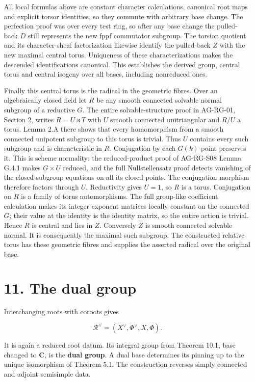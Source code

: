 \documentclass[11pt,a4paper,openany]{report}
\begin{document}
All local formulas above are constant character calculations, canonical root maps and explicit torsor identities, so they commute with arbitrary base change. The perfection proof was over every test ring, so after any base change the pulled-back \(D\) still represents the new fppf commutator subgroup. The torsion quotient and its character-sheaf factorization likewise identify the pulled-back \(Z\) with the new maximal central torus. Uniqueness of these characterizations makes the descended identifications canonical. This establishes the derived group, central torus and central isogeny over all bases, including nonreduced ones.

Finally this central torus is the radical in the geometric fibres. Over an algebraically closed field let \(R\) be any smooth connected solvable normal subgroup of a reductive \(G\). The entire solvable-structure proof in AG-RG-01, Section 2, writes \(R=U\rtimes T\) with \(U\) smooth connected unitriangular and \(R/U\) a torus. Lemma 2.A there shows that every homomorphism from a smooth connected unipotent subgroup to this torus is trivial. Thus \(U\) contains every such subgroup and is characteristic in \(R\). Conjugation by each \(G(k)\)-point preserves it. This is scheme normality: the reduced-product proof of AG-RG-S08 Lemma G.4.1 makes \(G\times U\) reduced, and the full Nullstellensatz proof detects vanishing of the closed-subgroup equations on all its closed points. The conjugation morphism therefore factors through \(U\). Reductivity gives \(U=1\), so \(R\) is a torus. Conjugation on \(R\) is a family of torus automorphisms. The full group-like coefficient calculation makes its integer exponent matrices locally constant on the connected \(G\); their value at the identity is the identity matrix, so the entire action is trivial. Hence \(R\) is central and lies in \(Z\). Conversely \(Z\) is smooth connected solvable normal. It is consequently the maximal such subgroup. The constructed relative torus has these geometric fibres and supplies the asserted radical over the original base.

\section{11. The dual group}\label{AG-RG-05-the-dual-group}

Interchanging roots with coroots gives

\[
\mathcal R^\vee=(X^\vee,\Phi^\vee,X,\Phi).
\]

It is again a reduced root datum. Its integral group from Theorem 10.1, base changed to \(\mathbf C\), is the \textbf{dual group}. A dual base determines its pinning up to the unique isomorphism of Theorem 5.1. The construction reverses simply connected and adjoint semisimple data.
\end{document}
